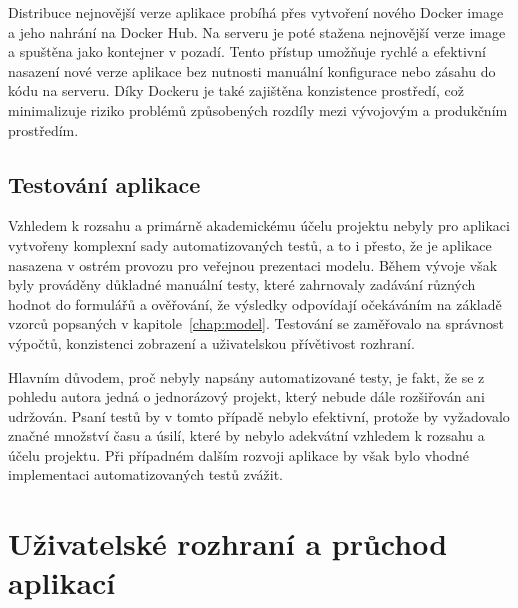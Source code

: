 Distribuce nejnovější verze aplikace probíhá přes vytvoření nového Docker image a jeho nahrání na Docker Hub. Na serveru je poté stažena nejnovější verze image a spuštěna jako kontejner v pozadí. Tento přístup umožňuje rychlé a efektivní nasazení nové verze aplikace bez nutnosti manuální konfigurace nebo zásahu do kódu na serveru. Díky Dockeru je také zajištěna konzistence prostředí, což minimalizuje riziko problémů způsobených rozdíly mezi vývojovým a produkčním prostředím.

\subsection{Testování aplikace}
\label{subsec:app_testovani}

Vzhledem k rozsahu a primárně akademickému účelu projektu nebyly pro aplikaci vytvořeny komplexní sady automatizovaných testů, a to i přesto, že je aplikace nasazena v ostrém provozu pro veřejnou prezentaci modelu. Během vývoje však byly prováděny důkladné manuální testy, které zahrnovaly zadávání různých hodnot do formulářů a ověřování, že výsledky odpovídají očekáváním na základě vzorců popsaných v kapitole~\ref{chap:model}. Testování se zaměřovalo na správnost výpočtů, konzistenci zobrazení a uživatelskou přívětivost rozhraní.

Hlavním důvodem, proč nebyly napsány automatizované testy, je fakt, že se z pohledu autora jedná o jednorázový projekt, který nebude dále rozšiřován ani udržován. Psaní testů by v tomto případě nebylo efektivní, protože by vyžadovalo značné množství času a úsilí, které by nebylo adekvátní vzhledem k rozsahu a účelu projektu. Při případném dalším rozvoji aplikace by však bylo vhodné implementaci automatizovaných testů zvážit.

\section{Uživatelské rozhraní a průchod aplikací}
\label{sec:app_ui}


